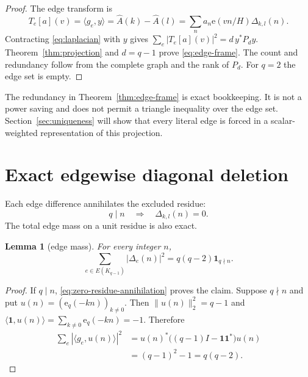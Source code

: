 \documentclass[11pt]{article}
\newtheorem{lemma}[theorem]{Lemma}
\newcommand{\e}{\mathrm e}
\newcommand{\one}{\mathbf 1}
\begin{document}
\begin{proof}
The edge transform is
\begin{equation}\label{eq:edge-transform}
 T_e[a](v)=\langle g_e,y\rangle
 =\widehat A(k)-\widehat A(l)
 =\sum_na_n\e(vn/H)\Delta_{k,l}(n).
\end{equation}
Contracting \eqref{eq:laplacian} with $y$ gives
$\sum_e|T_e[a](v)|^2=d\,y^*P_dy$.  Theorem~\ref{thm:projection} and
$d=q-1$ prove \eqref{eq:edge-frame}.  The count and redundancy follow from
the complete graph and the rank of $P_d$.  For $q=2$ the edge set is empty.
\end{proof}

The redundancy in Theorem~\ref{thm:edge-frame} is exact bookkeeping.  It is
not a power saving and does not permit a triangle inequality over the edge
set.  Section~\ref{sec:uniqueness} will show that every literal edge is forced
in a scalar-weighted representation of this projection.

\section{Exact edgewise diagonal deletion}

Each edge difference annihilates the excluded residue:
\begin{equation}\label{eq:zero-residue-annihilation}
 q\mid n\quad\Longrightarrow\quad \Delta_{k,l}(n)=0.
\end{equation}
The total edge mass on a unit residue is also exact.

\begin{lemma}[edge mass]\label{lem:edge-mass}
For every integer $n$,
\begin{equation}\label{eq:edge-mass}
 \boxed{
 \sum_{e\in E(K_{q-1})}|\Delta_e(n)|^2
 =q(q-2)\mathbf 1_{q\nmid n}.}
\end{equation}
\end{lemma}

\begin{proof}
If $q\mid n$, \eqref{eq:zero-residue-annihilation} proves the claim.  Suppose
$q\nmid n$ and put
$u(n)=(\e_q(-kn))_{k\ne0}$.  Then
$\|u(n)\|_2^2=q-1$ and
$\langle\one,u(n)\rangle=\sum_{k\ne0}\e_q(-kn)=-1$.  Therefore
\begin{align*}
 \sum_e|\langle g_e,u(n)\rangle|^2
 &=u(n)^*\bigl((q-1)I-\one\one^*\bigr)u(n)\\
 &=(q-1)^2-1=q(q-2).
\end{align*}
\end{proof}
\end{document}
